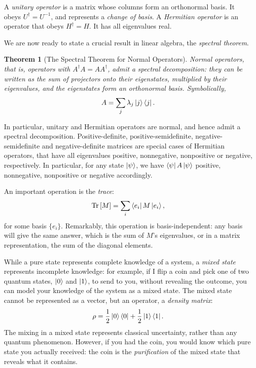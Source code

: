 \documentclass[10pt, a4paper]{article}
\numberwithin{equation}{section} %
\newcounter{stmt} %
\theoremstyle{definition}
\theoremstyle{plain}
\newtheorem{theorem}[stmt]{Theorem}
\newcommand{\?}{\mathrel{?}} %
\newcommand{\Tr}[2][]{\mathop{\mathrm{Tr}#1}\left[ #2 \right]} %
\begin{document}
\begin{appendices}
                    A \emph{unitary operator} is a matrix whose columns form an orthonormal basis. It obeys \(U^{\dagger} = U^{-1}\), and represents a \emph{change of basis}. A \emph{Hermitian operator} is an operator that obeys \(H^{\dagger} = H\). It has all eigenvalues real.

                    We are now ready to state a crucial result in linear algebra, the \emph{spectral theorem}.
                    \begin{theorem}[The Spectral Theorem for Normal Operators]
                      Normal operators, that is, operators with \(A^{\dagger}A = AA^{\dagger}\), admit a \emph{spectral decomposition}: they can be written as the sum of projectors onto their eigenstates, multiplied by their eigenvalues, and the eigenstates form an orthonormal basis. Symbolically,
                      \begin{equation}
                        A = \sum_j \lambda_j \ket{j}\bra{j}.
                      \end{equation}
                    \end{theorem}
                    In particular, unitary and Hermitian operators are normal, and hence admit a spectral decomposition. Positive-definite, positive-semidefinite, negative-semidefinite and negative-definite matrices are special cases of Hermitian operators, that have all eigenvalues positive, nonnegative, nonpositive or negative, respectively. In particular, for any state \(\ket{\psi}\), we have \(\bra{\psi}A\ket{\psi}\) positive, nonnegative, nonpositive or negative accordingly.

                    An important operation is the \emph{trace}:
                    \begin{equation}
                      \Tr{M} = \sum_i \bra{e_i}M\ket{e_i},
                    \end{equation}
                    for some basis \(\{e_i\}\). Remarkably, this operation is basis-independent: any basis will give the same answer, which is the sum of \(M\)'s eigenvalues, or in a matrix representation, the sum of the diagonal elements.

                    While a pure state represents complete knowledge of a system, a \emph{mixed state} represents incomplete knowledge: for example, if I flip a coin and pick one of two quantum states, \(\ket{0}\) and \(\ket{1}\), to send to you, without revealing the outcome, you can model your knowledge of the system as a mixed state. The mixed state cannot be represented as a vector, but an operator, a \emph{density matrix}:
                    \[ \rho = \frac{1}{2} \ket{0}\bra{0} + \frac{1}{2} \ket{1}\bra{1}. \]
                    The mixing in a mixed state represents classical uncertainty, rather than any quantum phenomenon. However, if you had the coin, you would know which pure state you actually received: the coin is the \emph{purification} of the mixed state that reveals what it contains.


\end{appendices}
\end{document}
